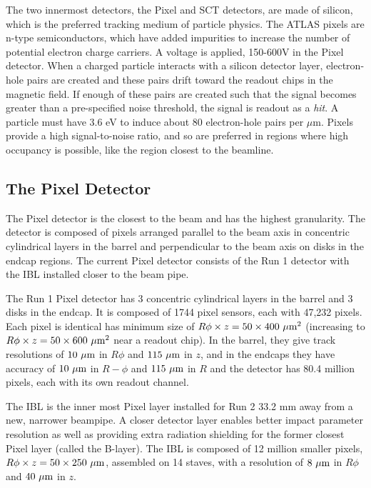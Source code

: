 The two innermost detectors, the Pixel and \ac{SCT} detectors, are made of silicon, which is the preferred tracking medium of particle physics. The \ac{ATLAS} pixels are n-type semiconductors, which have added impurities to increase the number of potential electron charge carriers. A voltage is applied, 150-600V in the Pixel detector.  When a charged particle interacts with a silicon detector layer, electron-hole pairs are created and these pairs drift toward the readout chips in the magnetic field. If enough of these pairs are created such that the signal becomes greater than a pre-specified noise threshold, the signal is readout as a \emph{hit}. A particle must have 3.6 eV to induce about 80 electron-hole pairs per $\mu$m. Pixels provide a high signal-to-noise ratio, and so are preferred in regions where high occupancy is possible, like the region closest to the beamline. \cite{silicon} 

\subsection{The Pixel Detector}

The Pixel detector is the closest to the beam and has the highest granularity. The detector is composed of pixels arranged parallel to the beam axis in concentric cylindrical layers in the barrel and perpendicular to the beam axis on disks in the endcap regions. The current Pixel detector consists of the Run 1 detector with the \ac{IBL} installed closer to the beam pipe. 

The Run 1 Pixel detector has 3 concentric cylindrical layers in the barrel and 3 disks in the endcap. It is composed of 1744 pixel sensors, each with 47,232 pixels. Each pixel is identical has minimum size of $R\phi \times z = 50 \times 400~\mu\text{m}^{2}$ (increasing to $R\phi \times z = 50 \times 600~\mu\text{m}^{2}$ near a readout chip). In the barrel, they give track resolutions of $10~\mu\text{m}$ in $R\phi$ and $115~\mu\text{m}$ in $z$, and in the endcaps they have accuracy of $10~\mu\text{m}$ in $R-\phi$ and $115~\mu\text{m}$ in $R$ and the detector has 80.4 million pixels, each with its own readout channel. 

The \ac{IBL} is the inner most Pixel layer installed for Run 2 33.2 mm away from a new, narrower beampipe. A closer detector layer enables better impact parameter resolution as well as providing extra radiation shielding for the former closest Pixel layer (called the B-layer). The \ac{IBL} is composed of 12 million smaller pixels, $R\phi \times z = 50 \times 250~\mu\text{m}$, assembled on 14 staves, with a resolution of $8~\mu\text{m}$ in $R\phi$ and $40~\mu\text{m}$ in $z$.



